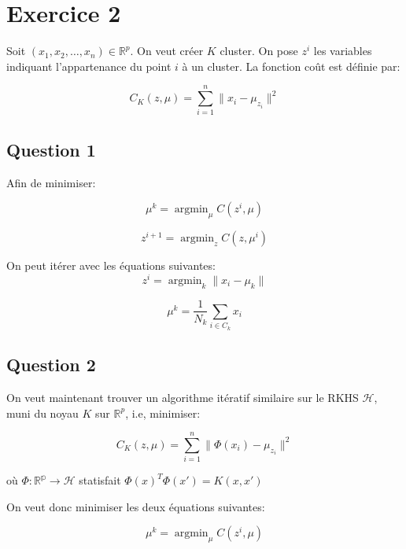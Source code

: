 \documentclass{article}
\DeclareMathOperator{\argmin}{argmin}
\begin{document}
\section{Exercice 2}

Soit $(x_1, x_2, \dots, x_n) \in \mathbb{R}^p$. On veut créer $K$ cluster. On
pose $z^i$ les variables indiquant l'appartenance du point $i$ à un cluster.
La fonction coût est définie par:

\begin{equation*}
C_K(z, \mu) = \sum_{i = 1}^n \| x_i - \mu_{z_i}\|^2
\end{equation*}


\subsection{Question 1}

Afin de minimiser:

\begin{equation*}
\mu^k = \argmin_{\mu} C(z^i, \mu)
\end{equation*}

\begin{equation*}
z^{i + 1} = \argmin_z C(z, \mu^i)
\end{equation*}

On peut itérer avec les équations suivantes:
\begin{equation*}
z^i = \argmin_k \| x_i - \mu_k\|
\end{equation*}

\begin{equation*}
\mu^k = \frac{1}{N_k} \sum_{i \in C_k}x_i
\end{equation*}

\subsection{Question 2}
On veut maintenant trouver un algorithme itératif similaire sur le RKHS
$\mathcal{H}$, muni du noyau $K$ sur $\mathbb{R}^p$, i.e, minimiser:

\begin{equation*}
C_K(z, \mu) = \sum_{i = 1}^n \| \Phi(x_i) - \mu_{z_i}\|^2
\end{equation*}

où $\Phi : \mathbb{R^p} \rightarrow \mathcal{H}$ statisfait $\Phi(x)^T \Phi(x')
= K(x, x')$

On veut donc minimiser les deux équations suivantes:

\begin{equation*}
\mu^k = \argmin_{\mu} C(z^i, \mu)
\end{equation*}
\end{document}
